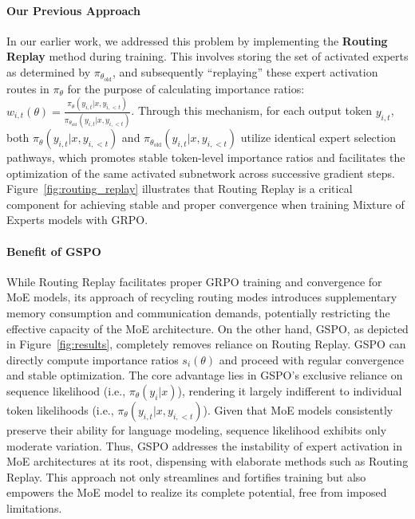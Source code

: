 \paragraph{Our Previous Approach} In our earlier work, we addressed this problem by implementing the \textbf{Routing Replay} method during training. This involves storing the set of activated experts as determined by $\pi_{\theta_\text{old}}$, and subsequently ``replaying'' these expert activation routes in $\pi_{\theta}$ for the purpose of calculating importance ratios: $w_{i,t}(\theta) = \frac{ \pi_{\theta} (y_{i,t} | x, y_{i,<t}) }{ \pi_{\theta_\text{old}} (y_{i,t} | x,y_{i,<t})}$. Through this mechanism, for each output token $y_{i,t}$, both $\pi_{\theta} (y_{i,t} | x, y_{i,<t})$ and $\pi_{\theta_\text{old}} (y_{i,t} | x, y_{i,<t})$ utilize identical expert selection pathways, which promotes stable token-level importance ratios and facilitates the optimization of the same activated subnetwork across successive gradient steps. Figure~\ref{fig:routing_replay} illustrates that Routing Replay is a critical component for achieving stable and proper convergence when training Mixture of Experts models with GRPO.

\paragraph{Benefit of GSPO} While Routing Replay facilitates proper GRPO training and convergence for MoE models, its approach of recycling routing modes introduces supplementary memory consumption and communication demands, potentially restricting the effective capacity of the MoE architecture. On the other hand, GSPO, as depicted in Figure~\ref{fig:results}, completely removes reliance on Routing Replay. GSPO can directly compute importance ratios $s_i(\theta)$ and proceed with regular convergence and stable optimization. The core advantage lies in GSPO's exclusive reliance on sequence likelihood (i.e., $\pi_{\theta} (y_i | x)$), rendering it largely indifferent to individual token likelihoods (i.e., $\pi_{\theta} (y_{i,t} | x, y_{i,<t})$). Given that MoE models consistently preserve their ability for language modeling, sequence likelihood exhibits only moderate variation. Thus, GSPO addresses the instability of expert activation in MoE architectures at its root, dispensing with elaborate methods such as Routing Replay. This approach not only streamlines and fortifies training but also empowers the MoE model to realize its complete potential, free from imposed limitations.

